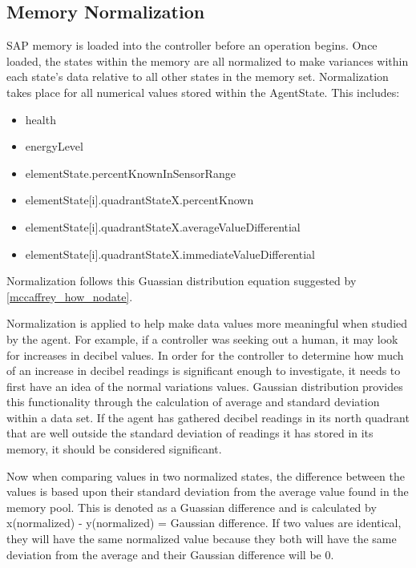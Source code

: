 \subsection{Memory Normalization}
SAP memory is loaded into the controller before an operation begins.
Once loaded, the states within the memory are all normalized to make variances within each state's data relative to all other states in the memory set.
Normalization takes place for all numerical values stored within the AgentState.
This includes:

\begin{itemize}
\item health
\item energyLevel
\item elementState.percentKnownInSensorRange
\item elementState[i].quadrantStateX.percentKnown
\item elementState[i].quadrantStateX.averageValueDifferential
\item elementState[i].quadrantStateX.immediateValueDifferential
\end{itemize}

Normalization follows this Guassian distribution equation suggested by \ref{mccaffrey_how_nodate}.


Normalization is applied to help make data values more meaningful when studied by the agent.
For example, if a controller was seeking out a human, it may look for increases in decibel values.
In order for the controller to determine how much of an increase in decibel readings is significant enough to investigate, it needs to first have an idea of the normal variations values.
Gaussian distribution provides this functionality through the calculation of average and standard deviation within a data set.
If the agent has gathered decibel readings in its north quadrant that are well outside the standard deviation of readings it has stored in its memory, it should be considered significant.

Now when comparing values in two normalized states, the difference between the values is based upon their standard deviation from the average value found in the memory pool.
This is denoted as a Guassian difference and is calculated by x(normalized) - y(normalized) = Gaussian difference. 
If two values are identical, they will have the same normalized value because they both will have the same deviation from the average and their Gaussian difference will be 0.

